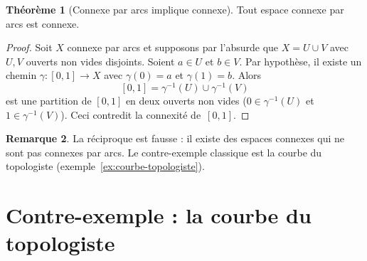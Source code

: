 \documentclass[12pt,a4paper,openany]{book}
\theoremstyle{definition}
\theoremstyle{cours}
\newtheorem{theoreme}{Théorème}[chapter]
\theoremstyle{coursnormal}
\newtheorem{remarque}[theoreme]{Remarque}
\begin{document}
\begin{theoreme}[Connexe par arcs implique connexe]
\label{thm:arcs-implique-connexe}
Tout espace connexe par arcs est connexe.
\end{theoreme}

\begin{proof}
Soit $X$ connexe par arcs et supposons par l'absurde que $X = U \cup V$ avec
$U, V$ ouverts non vides disjoints. Soient $a \in U$ et $b \in V$. Par hypothèse,
il existe un chemin $\gamma \colon [0,1] \to X$ avec $\gamma(0) = a$ et
$\gamma(1) = b$. Alors
\[
[0,1] = \gamma^{-1}(U) \cup \gamma^{-1}(V)
\]
est une partition de $[0,1]$ en deux ouverts non vides ($0 \in \gamma^{-1}(U)$
et $1 \in \gamma^{-1}(V)$). Ceci contredit la connexité de~$[0,1]$.
\end{proof}

\begin{remarque}
\label{rem:reciproque-fausse}
La réciproque est fausse : il existe des espaces connexes qui ne sont pas connexes
par arcs. Le contre-exemple classique est la courbe du topologiste
(exemple~\ref{ex:courbe-topologiste}).
\end{remarque}

\section{Contre-exemple : la courbe du topologiste}
\label{sec:courbe-topologiste}
\end{document}
